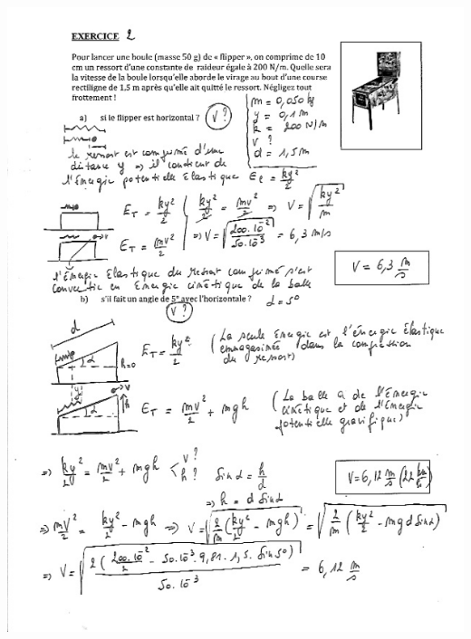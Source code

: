 \includegraphics[width=17.498cm,height=24.552cm]{Pictures/100000010000026400000345AA0147C4E87FFA0E.png}

